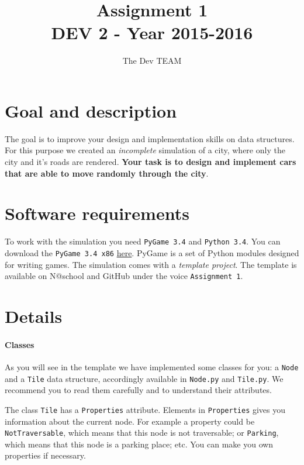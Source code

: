 \documentclass[10pt,a4paper]{article}
\begin{document}
\title{Assignment 1\\DEV 2 - Year 2015-2016}
\author{The Dev TEAM}
\maketitle


\section{Goal and description}
The goal is to improve your design and implementation skills on data structures. For this purpose we created an \textit{incomplete} simulation of a city, where only the city and it's roads are rendered. \textbf{Your task is to design and implement cars that are able to move randomly through the city}. 
	
	
\section{Software requirements}
To work with the simulation you need \texttt{PyGame 3.4} and \texttt{Python 3.4}. You can download the \texttt{PyGame 3.4 x86} \href{https://bitbucket.org/pygame/pygame/downloads/pygame-1.9.2a0-hg_ea3b3bb8714a.win32-py3.4.msi}{here}. PyGame is a set of Python modules designed for writing games.	The simulation comes with a \textit{template project}. The template is available on N@school and GitHub under the voice \texttt{Assignment 1}.

\section{Details}

\paragraph{Classes}
As you will see in the template we have implemented some classes for you: a \texttt{Node} and a \texttt{Tile} data structure, accordingly available in \texttt{Node.py} and \texttt{Tile.py}. We recommend you to read them carefully and to understand their attributes.

The class \texttt{Tile} has a \texttt{Properties} attribute. Elements in \texttt{Properties} gives you information about the current node. For example a property could be \texttt{NotTraversable}, which means that this node is not traversable; or \texttt{Parking}, which means that this node is a parking place; etc. You can make you own properties if necessary.
\end{document}
